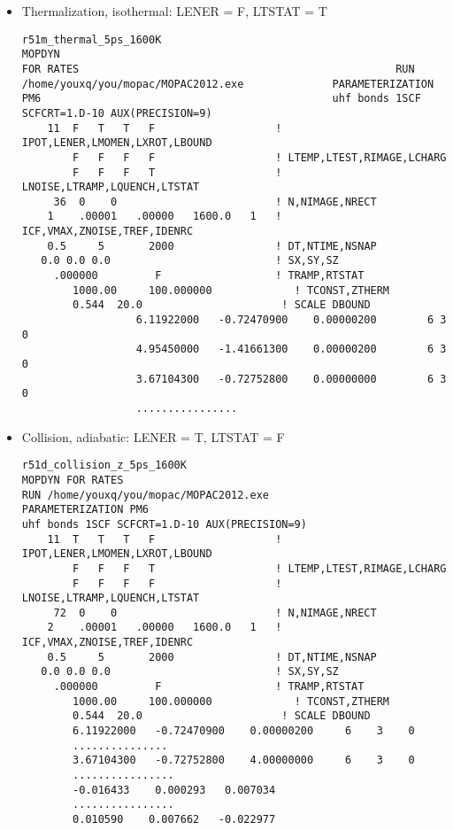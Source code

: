 \documentclass[11pt]{JHEP3}
\begin{document}
\begin{itemize}
\item Thermalization, isothermal: LENER = F, LTSTAT = T
\begin{lstlisting}
r51m_thermal_5ps_1600K                                        MOPDYN
FOR RATES                                                  RUN
/home/youxq/you/mopac/MOPAC2012.exe              PARAMETERIZATION
PM6                                              uhf bonds 1SCF
SCFCRT=1.D-10 AUX(PRECISION=9)
    11  F   T   T   F                   ! IPOT,LENER,LMOMEN,LXROT,LBOUND
        F   F   F   F                   ! LTEMP,LTEST,RIMAGE,LCHARG
        F   F   F   T                   ! LNOISE,LTRAMP,LQUENCH,LTSTAT
     36  0    0                         ! N,NIMAGE,NRECT
    1    .00001   .00000   1600.0   1   ! ICF,VMAX,ZNOISE,TREF,IDENRC
    0.5     5       2000                ! DT,NTIME,NSNAP
   0.0 0.0 0.0                          ! SX,SY,SZ
     .000000         F                  ! TRAMP,RTSTAT
        1000.00     100.000000             ! TCONST,ZTHERM
        0.544  20.0                      ! SCALE DBOUND
                  6.11922000   -0.72470900    0.00000200        6 3 0
                  4.95450000   -1.41661300    0.00000200        6 3 0
                  3.67104300   -0.72752800    0.00000000        6 3 0
                  ................
\end{lstlisting}

\item Collision, adiabatic: LENER = T, LTSTAT = F
\begin{lstlisting}
r51d_collision_z_5ps_1600K
MOPDYN FOR RATES
RUN /home/youxq/you/mopac/MOPAC2012.exe
PARAMETERIZATION PM6
uhf bonds 1SCF SCFCRT=1.D-10 AUX(PRECISION=9)
    11  T   T   T   F                   ! IPOT,LENER,LMOMEN,LXROT,LBOUND
        F   F   F   T                   ! LTEMP,LTEST,RIMAGE,LCHARG
        F   F   F   F                   ! LNOISE,LTRAMP,LQUENCH,LTSTAT
     72  0    0                         ! N,NIMAGE,NRECT
    2    .00001   .00000   1600.0   1   ! ICF,VMAX,ZNOISE,TREF,IDENRC
    0.5     5       2000                ! DT,NTIME,NSNAP
   0.0 0.0 0.0                          ! SX,SY,SZ
     .000000         F                  ! TRAMP,RTSTAT
        1000.00     100.000000             ! TCONST,ZTHERM
        0.544  20.0                      ! SCALE DBOUND
        6.11922000   -0.72470900    0.00000200     6    3    0
        ...............
        3.67104300   -0.72752800    4.00000000     6    3    0
        ................
        -0.016433    0.000293   0.007034
        ................
        0.010590    0.007662   -0.022977
\end{lstlisting}


\end{itemize}
\end{document}
